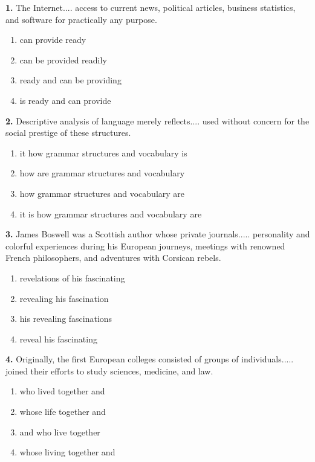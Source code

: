 \documentclass[12pt]{article}
\begin{document}
\noindent\textbf{1.} The Internet.... access to current news, political articles, business statistics, and software for practically any purpose.
\begin{enumerate}[label=(\Alph*),leftmargin=*,itemsep=0.2em]
\item can provide ready
\item can be provided readily
\item ready and can be providing
\item is ready and can provide
\end{enumerate}
\par
\vspace{0.25\baselineskip}
\noindent\textbf{2.} Descriptive analysis of language merely reflects.... used without concern for the social prestige of these structures.
\begin{enumerate}[label=(\Alph*),leftmargin=*,itemsep=0.2em]
\item it how grammar structures and vocabulary is
\item how are grammar structures and vocabulary
\item how grammar structures and vocabulary are
\item it is how grammar structures and vocabulary are
\end{enumerate}
\par
\vspace{0.25\baselineskip}
\noindent\textbf{3.} James Boswell was a Scottish author whose private journals..... personality and colorful experiences during his European journeys, meetings with renowned French philosophers, and adventures with Corsican rebels.
\begin{enumerate}[label=(\Alph*),leftmargin=*,itemsep=0.2em]
\item revelations of his fascinating
\item revealing his fascination
\item his revealing fascinations
\item reveal his fascinating
\end{enumerate}
\par
\vspace{0.25\baselineskip}
\noindent\textbf{4.} Originally, the first European colleges consisted of groups of individuals..... joined their efforts to study sciences, medicine, and law.
\begin{enumerate}[label=(\Alph*),leftmargin=*,itemsep=0.2em]
\item who lived together and
\item whose life together and
\item and who live together
\item whose living together and
\end{enumerate}
\end{document}
